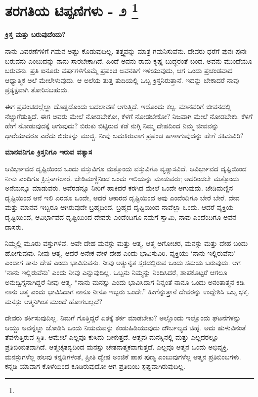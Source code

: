 
\chapter[ತರಗತಿಯ ಟಿಪ್ಪಣಿಗಳು - ೨ ]{ತರಗತಿಯ ಟಿಪ್ಪಣಿಗಳು - ೨ \protect\footnote{}}

\centerline{\textbf{ಕ್ರಿಸ್ತ ಮತ್ತು ಬರುವುದೆಂದು?}}

ನಾನು ವಿವರಣೆಗಳಿಗೆ ಗಮನ ಅಷ್ಟು ಕೊಡುವುದಿಲ್ಲ. ತತ್ತ್ವವನ್ನು ಮಾತ್ರ ಗಮನಿಸುವೆನು. ದೇವರು ಧರೆಗೆ ಪುನಃ ಪುನಃ ಬರುವನು ಎಂಬುದನ್ನು ನಾನು ಸಾರಬೇಕಾಗಿದೆ. ಹಿಂದೆ ಅವನು ರಾಮ ಕೃಷ್ಣ ಬುದ್ಧರಂತೆ ಬಂದ. ಅವನು ಮುಂದೆಯೂ ಬರುವನು. ಪ್ರತಿ ಐನೂರು ವರ್ಷಗಳಿಗೊಮ್ಮೆ ಪ್ರಪಂಚ ಅವನತಿಗೆ ಇಳಿಯುವುದು, ಆಗ ಒಂದು ಪ್ರಚಂಡವಾದ ಆಧ್ಯಾತ್ಮಿಕ ಅಲೆ ಮೇಲೇಳುವುದು. ಆ ಅಲೆಯ ತುತ್ತ ತುದಿಯಲ್ಲಿ ಒಬ್ಬ ಕ್ರಿಸ್ತನಿರುತ್ತಾನೆ. ಇದನ್ನು ಬೇಕಾದರೆ ನಾವು ಪ್ರತ್ಯಕ್ಷವಾಗಿ ತೋರಿಸಬಹುದು.

ಈಗ ಪ್ರಪಂಚದಲ್ಲೆಲ್ಲಾ ದೊಡ್ಡದೊಂದು ಬದಲಾವಣೆ ಆಗುತ್ತಿದೆ. ಇದೊಂದು ಕಲ್ಪ. ಮಾನವರಿಗೆ ಜೀವನದಲ್ಲಿ ನೆಚ್ಚುಗೆಡುತ್ತಿದೆ. ಈಗ ಅವರು ಮೇಲೆ ನೋಡಬೇಕೋ, ಕೆಳಗೆ ನೋಡಬೇಕೋ? ನಿಜವಾಗಿ ಮೇಲೆ ನೋಡಬೇಕು. ಕೆಳಗೆ ಹೇಗೆ ನೋಡುವುದಕ್ಕೆ ಆಗುವುದು? ಬಿರುಕು ಬಿಟ್ಟಿರುವ ಕಡೆ ನುಗ್ಗಿ ನಿಮ್ಮ ದೇಹದಿಂದ ನಿಮ್ಮ ಜೀವವನ್ನು ಧಾರೆಯಾದರೂ ಎರೆದು ಬಿರುಕನ್ನು ಮುಚ್ಚಿ. ನೀವು ಬದುಕಿರುವಾಗ ಪ್ರಪಂಚ ಹಾಳಾಗುವುದನ್ನು ಹೇಗೆ ಸಹಿಸುವಿರಿ?

\begin{center}
\textbf{ಮಾನವನಿಗೂ ಕ್ರಿಸ್ತನಿಗೂ ಇರುವ ವತ್ಯಾಸ}
\end{center}

ಆವಿರ್ಭಾವದ ದೃಷ್ಟಿಯಿಂದ ಒಂದು ವಸ್ತುವಿಗೂ ಮತ್ತೊಂದು ವಸ್ತುವಿಗೂ ವ್ಯತ್ಯಾಸವಿದೆ. ಆವಿರ್ಭಾವದ ದೃಷ್ಟಿಯಿಂದ ನೀನು ಎಂದಿಗೂ ಕ್ರಿಸ್ತನಾಗಲಾರೆ. ಜೇಡಿಮಣ್ಣಿನಿಂದ ಒಂದು ಇಲಿಯನ್ನು ಮಾಡುವರು; ಅದರಿಂದಲೇ ಮತ್ತೊಂದು ಅನೆಯನ್ನೂ ಮಾಡುವರು. ಅವೆರಡನ್ನೂ ನೀರಿಗೆ ಹಾಕಿದರೆ ಕರಗಿದ ಮೇಲೆ ಒಂದೇ ಆಗುವುದು. ಜೇಡಿಮಣ್ಣಿನ ದೃಷ್ಟಿಯಿಂದ ಆನೆ ಇಲಿ ಎರಡೂ ಒಂದೇ, ಆದರೆ ಆಕಾರದ ದೃಷ್ಟಿಯಿಂದ ಅವು ಎಂದೆಂದಿಗೂ ಬೇರೆ ಬೇರೆ. ದೇವ ಮತ್ತು ಮಾನವ ಇಬ್ಬರೂ ಆಗಿರುವುದೇ ಬ್ರಹ್ಮದಿಂದ, ಬ್ರಹ್ಮದ ದೃಷ್ಟಿಯಿಂದ ನಾವೆಲ್ಲಾ ಒಂದು. ಆದರೆ ವ್ಯಕ್ತಿಯ ದೃಷ್ಟಿಯಿಂದ, ಆವಿರ್ಭಾವದ ದೃಷ್ಟಿಯಿಂದ ದೇವರು ಎಂದೆಂದಿಗೂ ನಮಗೆ ಸ್ವಾಮಿ, ನಾವು ಎಂದೆಂದಿಗೂ ಅವನ ದಾಸರು.

ನಿಮ್ಮಲ್ಲಿ ಮೂರು ವಸ್ತುಗಳಿವೆ. ಅವೇ ದೇಹ ಮನಸ್ಸು ಮತ್ತು ಆತ್ಮ. ಆತ್ಮ ಅಗೋಚರ, ಮನಸ್ಸು ಮತ್ತು ದೇಹ ಬಂದು ಹೋಗುವುವು. ನೀವು ಆತ್ಮ. ಆದರೆ ಅನೇಕ ವೇಳೆ ದೇಹ ಎಂದು ಭಾವಿಸುವಿರಿ. ವ್ಯಕ್ತಿಯು ‘ನಾನು ಇಲ್ಲಿರುವೆನು’ ಎಂದಾಗ ತಾನು ದೇಹ ಎಂದು ಭಾವಿಸುವನು. ನೀವು ಅತ್ಯುನ್ನತ ಸ್ತರದಲ್ಲಿರುವ ಒಂದು ಸಮಯ ಬರುವುದು. ಆಗ ‘ನಾನು ಇಲ್ಲಿರುವೆನು’ ಎಂದು ನೀವು ಎನ್ನುವುದಿಲ್ಲ. ಒಬ್ಬನು ನಿಮ್ಮನ್ನು ನಿಂದಿಸಿದರೆ, ಶಾಪಕೊಟ್ಟರೆ ಆಗಲೂ ಅನುದ್ವಿಗ್ನನಾಗಿದ್ದರೆ ನೀವು ಆತ್ಮ. “ನಾನು ಮನಸ್ಸು ಎಂದು ಭಾವಿಸಿದಾಗ ನಿನ್ನಂತೆ ನಾನೂ ಒಂದು ಅನಂತಾತ್ಮನ ಕಿಡಿ. ನಾನು ಆತ್ಮ ಎಂದು ಭಾವಿಸಿದಾಗ ನಾನೂ ನೀನೂ ಇಬ್ಬರು ಒಂದೇ.” ಹೀಗೆನ್ನುತ್ತಾನೆ ದೇವರನ್ನು ಉದ್ದೇಶಿಸಿ ಒಬ್ಬ ಭಕ್ತ. ಮನಸ್ಸು ಆತ್ಮನಿಗಿಂತ ಮುಂದೆ ಹೋಗಬಲ್ಲದೆ?

ದೇವರು ತರ್ಕಿಸುವುದಿಲ್ಲ. ನಿಮಗೆ ಗೊತ್ತಿದ್ದರೆ ಏತಕ್ಕೆ ತರ್ಕ ಮಾಡಬೇಕು? ಅಲ್ಲೊಂದು ಇಲ್ಲೊಂದು ಘಟನೆಗಳನ್ನು ಆಯ್ದು ಅವನ್ನೆಲ್ಲಾ ಜೋಡಿಸಿ ಒಂದು ನಿಯಮವನ್ನು ಕಂಡುಹಿಡಿಯುವುದು ದೌರ್ಬಲ್ಯದ ಚಿಹ್ನೆ. ಅದು ಹುಳುವಿನಂತೆ ತೆವಳುತ್ತಿರುವ ಸ್ಥಿತಿ. ಆಮೇಲೆ ಎಲ್ಲವೂ ಕುಸಿದು ಬೀಳುತ್ತದೆ. ಆತ್ಮವು ಮನಸ್ಸಿನಲ್ಲಿ ಮತ್ತು ಎಲ್ಲದರಲ್ಲೂ ಪ್ರತಿಬಿಂಬಿತವಾಗಿದೆ. ಆತ್ಮಚೈತನ್ಯದಿಂದ ಮನಸ್ಸು ಚೇತನಾತ್ಮಕವಾಗುತ್ತದೆ. ಎಲ್ಲವೂ ಆತ್ಮನ ಒಂದು ಅಭಿವ್ಯಕ್ತಿ. ಮನಸ್ಸುಗಳೆಲ್ಲ ಹಲವು ಕನ್ನಡಿಗಳಂತೆ, ಪ್ರೀತಿ ದ್ವೇಷ ಅಂಜಿಕೆ ಪಾಪ ಪುಣ್ಯ ಎಂಬುವುಗಳೆಲ್ಲ ಆತ್ಮನ ಪ್ರತಿಬಿಂಬಗಳು. ಕನ್ನಡಿ ಯಾವಾಗ ಕೊಳೆಯಿಂದ ಕೂಡಿರುವುದೋ ಆಗ ಪ್ರತಿಬಿಂಬ ಸ್ಪಷ್ಟವಾಗಿರುವುದಿಲ್ಲ.

